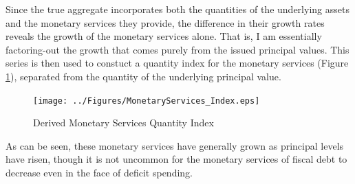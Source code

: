 \documentclass[11pt,a4paper,margin=1.5in]{article}
\begin{document}
Since the true aggregate incorporates both the quantities of the underlying assets and the monetary services they provide, the difference in their growth rates reveals the growth of the monetary services alone.
That is, I am essentially factoring-out the growth that comes purely from the issued principal values.
This series is then used to constuct a quantity index for the monetary services (Figure \ref{fig:MS_Index}), separated from the quantity of the underlying principal value.
\begin{figure}[p]
	\centering
	\texttt{[image: ../Figures/MonetaryServices\_Index.eps]}
	\caption{Derived Monetary Services Quantity Index}
	\label{fig:MS_Index}
\end{figure}
As can be seen, these monetary services have generally grown as principal levels have risen, though it is not uncommon for the monetary services of fiscal debt to decrease even in the face of deficit spending.
\end{document}
